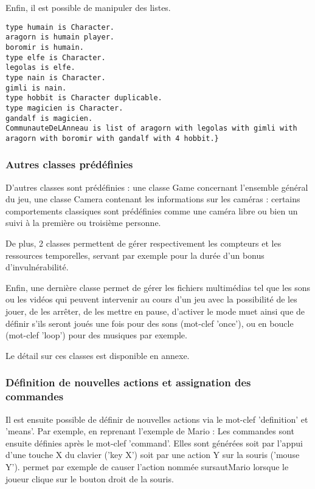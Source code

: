 Enfin, il est possible de manipuler des listes.
\begin{lstlisting}[language=GameGrammar]
type humain is Character. 
aragorn is humain player.
boromir is humain.
type elfe is Character. 
legolas is elfe.
type nain is Character.
gimli is nain.
type hobbit is Character duplicable. 
type magicien is Character. 
gandalf is magicien.
CommunauteDeLAnneau is list of aragorn with legolas with gimli with aragorn with boromir with gandalf with 4 hobbit.}
\end{lstlisting}

\subsubsection{Autres classes prédéfinies}

D'autres classes sont prédéfinies : une classe Game concernant l'ensemble général du jeu, une classe Camera contenant les informations sur les caméras :
certains comportements classiques sont prédéfinies comme une caméra libre ou bien un suivi à la première ou troisième personne.

De plus, 2 classes permettent de gérer respectivement les compteurs et les ressources temporelles, servant par exemple pour la durée d'un bonus d'invulnérabilité.

Enfin, une dernière classe permet de gérer les fichiers multimédias tel que les sons ou les vidéos qui peuvent intervenir au cours d'un jeu 
avec la possibilité de les jouer, de les arrêter, de les mettre en pause, d'activer le mode muet ainsi que de définir s'ils seront joués 
une fois pour des sons (mot-clef 'once'), ou en boucle (mot-clef 'loop') pour des musiques par exemple.

Le détail sur ces classes est disponible en annexe.

\subsubsection{Définition de nouvelles actions et assignation des commandes}

Il est ensuite possible de définir de nouvelles actions via le mot-clef 'definition' et 'means'.
Par exemple, en reprenant l'exemple de Mario : 
Les commandes sont ensuite définies après le mot-clef 'command'. Elles sont générées soit par l'appui d'une touche X du clavier ('key X') soit par 
une action Y sur la souris ('mouse Y').
 permet par exemple de causer l'action nommée sursautMario lorsque le joueur clique sur le bouton droit de la souris.


